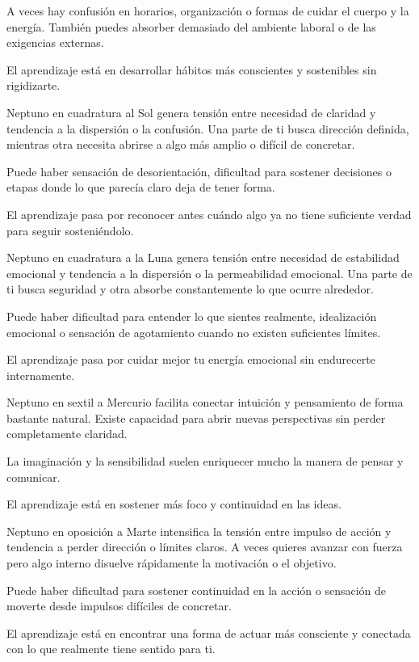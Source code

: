\documentclass[11pt,a4paper]{article}
\begin{document}
A veces hay confusión en horarios, organización o formas de cuidar el cuerpo y la energía. También puedes absorber demasiado del ambiente laboral o de las exigencias externas.

El aprendizaje está en desarrollar hábitos más conscientes y sostenibles sin rigidizarte.

Neptuno en cuadratura al Sol genera tensión entre necesidad de claridad y tendencia a la dispersión o la confusión. Una parte de ti busca dirección definida, mientras otra necesita abrirse a algo más amplio o difícil de concretar.

Puede haber sensación de desorientación, dificultad para sostener decisiones o etapas donde lo que parecía claro deja de tener forma.

El aprendizaje pasa por reconocer antes cuándo algo ya no tiene suficiente verdad para seguir sosteniéndolo.

Neptuno en cuadratura a la Luna genera tensión entre necesidad de estabilidad emocional y tendencia a la dispersión o la permeabilidad emocional. Una parte de ti busca seguridad y otra absorbe constantemente lo que ocurre alrededor.

Puede haber dificultad para entender lo que sientes realmente, idealización emocional o sensación de agotamiento cuando no existen suficientes límites.

El aprendizaje pasa por cuidar mejor tu energía emocional sin endurecerte internamente.

Neptuno en sextil a Mercurio facilita conectar intuición y pensamiento de forma bastante natural. Existe capacidad para abrir nuevas perspectivas sin perder completamente claridad.

La imaginación y la sensibilidad suelen enriquecer mucho la manera de pensar y comunicar.

El aprendizaje está en sostener más foco y continuidad en las ideas.

Neptuno en oposición a Marte intensifica la tensión entre impulso de acción y tendencia a perder dirección o límites claros. A veces quieres avanzar con fuerza pero algo interno disuelve rápidamente la motivación o el objetivo.

Puede haber dificultad para sostener continuidad en la acción o sensación de moverte desde impulsos difíciles de concretar.

El aprendizaje está en encontrar una forma de actuar más consciente y conectada con lo que realmente tiene sentido para ti.
\end{document}

